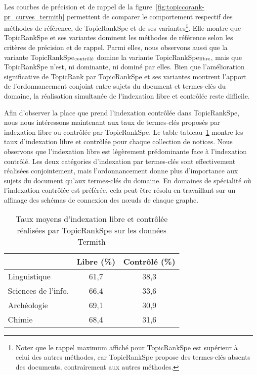   Les courbes de précision et de rappel de la
  figure~\ref{fig:topiccorank-pr_curves_termith} permettent de comparer le
  comportement respectif des méthodes de référence, de Topic\-RankSpe et de
  ses variantes\footnote{Notez que le rappel maximum affiché pour TopicRankSpe
  est supérieur à celui des autres méthodes, car TopicRankSpe propose des
  termes-clés absents des documents, contrairement aux autres méthodes.}. Elle
  montre que TopicRankSpe et ses variantes dominent les méthodes de référence
  selon les critères de précision et de rappel.
  Parmi elles, nous observons aussi que la variante
  TopicRankSpe$_\textnormal{contrôlé}$ domine la variante
  TopicRankSpe$_\textnormal{libre}$, mais que TopicRankSpe n'est, ni
  dominante, ni dominé par elles. Bien que l'amélioration significative de
  TopicRank par TopicRankSpe et ses variantes montrent l'apport de
  l'ordonnancement conjoint entre sujets du document et termes-clés du
  domaine, la réalisation simultanée de l'indexation libre et contrôlée
  reste difficile.
  

  Afin d'observer la place que prend l'indexation contrôlée dans TopicRankSpe,
  nous nous intéressons maintenant aux taux de
  termes-clés proposés par indexation libre ou contrôlée par TopicRankSpe.
  Le table tableau~\ref{tab:assignment_ratio_termith} montre les taux
  d'indexation libre et contrôlée pour chaque collection de notices.
  Nous observons que l'indexation libre est légèrement prédominante face à
  l'indexation contrôlé. Les deux
  catégories d'indexation par termes-clés sont effectivement réalisées
  conjointement, mais l'ordonnancement donne plus d'importance aux sujets
  du document qu'aux termes-clés du domaine. En domaines de
  spécialité où l'indexation contrôlée est préférée, cela peut être résolu en
  travaillant sur un affinage des schémas de connexion des n\oe{}uds de
  chaque graphe.
  \begin{table}
    \centering
    \begin{tabular}{l|c|c}
        \toprule
        & Libre (\%) & Contrôlé (\%)\\
        \hline
        Linguistique & 61,7 & 38,3\\
        Sciences de l'info. & 66,4 & 33,6\\
        Archéologie & 69,1 & 30,9\\
        Chimie & 68,4 & 31,6\\
        \bottomrule
    \end{tabular}
    \caption{Taux moyens d'indexation libre et contrôlée réalisées par
             TopicRankSpe sur les données Termith
             \label{tab:assignment_ratio_termith}}
  \end{table}

